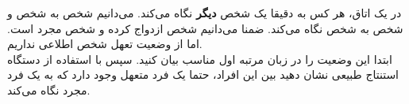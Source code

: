 در یک اتاق، هر کس به دقیقا یک شخص \textbf{دیگر} نگاه می‌کند. می‌دانیم شخص  به شخص  و شخص  به شخص  نگاه می‌کند. ضمنا می‌دانیم شخص  ازدواج کرده و شخص  مجرد است. اما از وضعیت تعهل شخص  اطلاعی نداریم.\\
ابتدا این وضعیت را در زبان مرتبه اول مناسب بیان کنید. سپس با استفاده از دستگاه استنتاج طبیعی نشان دهید بین این افراد، حتما یک فرد متعهل وجود دارد که به یک فرد مجرد نگاه می‌کند.
